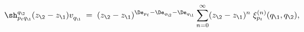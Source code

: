 \begin{equation}\label{shv_exp}
\sh_{p_tq_\1}^{q_\2}(z_\2-z_\1)v_{q_\1}^{}\;=\;
(z_\2-z_\1)^{\De_{p_t}-\De_{q_\2}-\De_{q_\1}}\sum_{n=0}^{\infty}(z_\2-z_\1)^n\;
\xi_{p_t}^{(n)}(q_\1,q_\2),
\end{equation}

